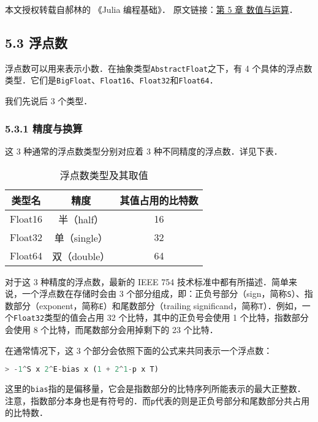 
本文授权转载自郝林的 《Julia 编程基础》． 原文链接：\href{https://github.com/hyper0x/JuliaBasics/blob/master/book/ch05.md}{第 5 章 数值与运算}．


\subsection{5.3 浮点数}

浮点数可以用来表示小数．在抽象类型\verb|AbstractFloat|之下，有 4 个具体的浮点数类型．它们是\verb|BigFloat|、\verb|Float16|、\verb|Float32|和\verb|Float64|．

我们先说后 3 个类型．

\subsubsection{5.3.1 精度与换算}

这 3 种通常的浮点数类型分别对应着 3 种不同精度的浮点数．详见下表．

\begin{table}[ht]
\centering
\caption{浮点数类型及其取值}\label{JuC5S3_tab1}
\begin{tabular}{|c|c|c|}
\hline
类型名 & 精度 & 其值占用的比特数 \\
\hline
Float16 & 半（half） & 16 \\
\hline
Float32 & 单（single） & 32 \\
\hline
Float64 & 双（double） & 64 \\
\hline
\end{tabular}
\end{table}

对于这 3 种精度的浮点数，最新的 IEEE 754 技术标准中都有所描述．简单来说，一个浮点数在存储时会由 3 个部分组成，即：正负号部分（sign，简称\verb|S|）、指数部分（exponent，简称\verb|E|）和尾数部分（trailing significand，简称\verb|T|）．例如，一个\verb|Float32|类型的值会占用 32 个比特，其中的正负号会使用 1 个比特，指数部分会使用 8 个比特，而尾数部分会用掉剩下的 23 个比特．

在通常情况下，这 3 个部分会依照下面的公式来共同表示一个浮点数：
\begin{lstlisting}[language=julia]
> -1^S x 2^E-bias x (1 + 2^1-p x T)
\end{lstlisting}

这里的\verb|bias|指的是偏移量，它会是指数部分的比特序列所能表示的最大正整数．注意，指数部分本身也是有符号的．而\verb|p|代表的则是正负号部分和尾数部分共占用的比特数．

